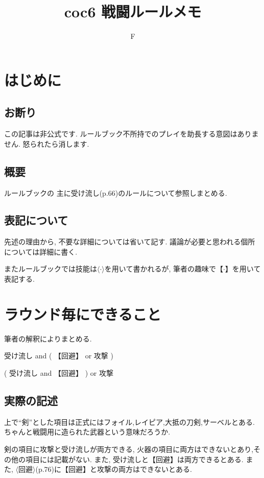 \documentclass{jsarticle}
\title{coc6 戦闘ルールメモ}
\author{F}
\begin{document}
\maketitle
\section{はじめに}
\subsection*{お断り}
この記事は非公式です.
ルールブック\cite{1130282268636976512}不所持でのプレイを助長する意図はありません.
怒られたら消します.

\subsection*{概要}
ルールブック\cite{1130282268636976512}の
主に受け流し(p.66)のルールについて参照しまとめる.

\subsection*{表記について}
先述の理由から,
不要な詳細については省いて記す.
議論が必要と思われる個所については詳細に書く.

またルールブックでは技能は$\langle\cdot\rangle$を用いて書かれるが,
筆者の趣味で【$\cdot$】を用いて表記する.


\section{ラウンド毎にできること}
筆者の解釈によりまとめる.
\begin{description}[labelwidth=10em]
    \item[剣
    を持っている場合]
        受け流し and ( 【回避】 or 攻撃 )
    \item[その他]
        ( 受け流し and 【回避】 ) or 攻撃
\end{description}
\subsection*{実際の記述}
上で``剣''とした項目は正式にはフォイル,レイピア,大抵の刀剣,サーベルとある.
ちゃんと戦闘用に造られた武器という意味だろうか.

剣の項目に攻撃と受け流しが両方できる,
火器の項目に両方はできないとあり,その他の項目には記載がない.
また,
受け流しと【回避】は両方できるとある.
また,
$\langle\mbox{回避}\rangle$(p.76)に【回避】と攻撃の両方はできないとある.
\end{document}
